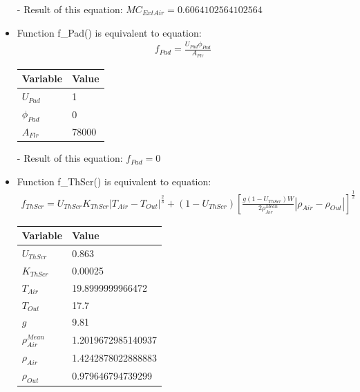 \documentclass[a4paper]{article}
\begin{document}
\begin{itemize}
  \item[-] Result of this equation: \(MC_{ExtAir} = 0.6064102564102564\)

  \item Function f\_Pad() is equivalent to equation:
        \begin{align*}
          f_{Pad} = \frac{U_{Pad} \phi_{Pad}}{A_{Flr}}
        \end{align*}

        \begin{table}[H]
          \centering
          \begin{tabular}{|l|l|}
            \hline
            \textbf{Variable} & \textbf{Value} \\ \hline
            \(U_{Pad}\)       & 1              \\ \hline
            \(\phi_{Pad}\)    & 0              \\ \hline
            \(A_{Flr}\)       & 78000          \\ \hline
          \end{tabular}
        \end{table}

  \item[-] Result of this equation: \(f_{Pad} = 0\)

  \item Function f\_ThScr() is equivalent to equation:
        \begin{align*}
          f_{ThScr} = U_{ThScr} K_{ThScr} |T_{Air} - T_{Out}| ^{\frac{2}{3}} + (1 - U_{ThScr}) {\left[\frac{g(1 - U_{ThScr})W}{2\rho^{Mean}_{Air}} |\rho_{Air} - \rho_{Out}|\right]}^{\frac{1}{2}}
        \end{align*}

        \begin{table}[H]
          \centering
          \begin{tabular}{|l|l|}
            \hline
            \textbf{Variable}     & \textbf{Value}     \\ \hline
            \(U_{ThScr}\)         & 0.863              \\ \hline
            \(K_{ThScr}\)         & 0.00025            \\ \hline
            \(T_{Air}\)           & 19.8999999966472   \\ \hline
            \(T_{Out}\)           & 17.7               \\ \hline
            \(g\)                 & 9.81               \\ \hline
            \(\rho^{Mean}_{Air}\) & 1.2019672985140937 \\ \hline
            \(\rho_{Air}\)        & 1.4242878022888883 \\ \hline
            \(\rho_{Out}\)        & 0.979646794739299  \\ \hline
          \end{tabular}
        \end{table}


\end{itemize}
\end{document}
